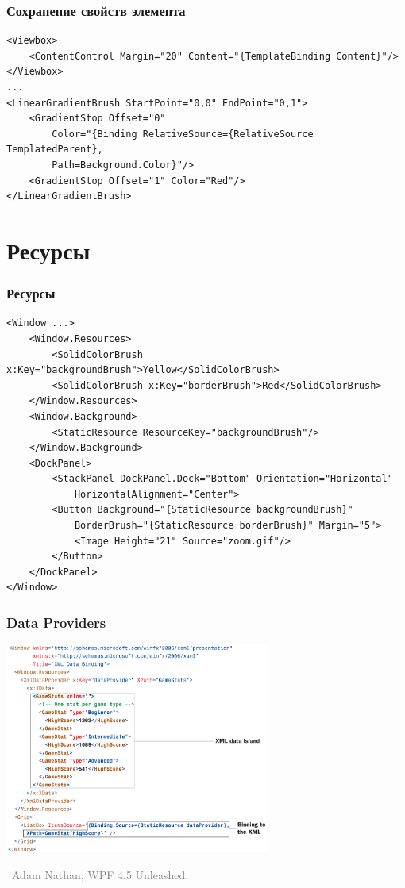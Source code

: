 \documentclass[xetex,mathserif,serif]{beamer}
\newcommand{\attribution}[1] {
\vspace{-5mm}\begin{flushright}\begin{scriptsize}\textcolor{gray}{\textcopyright\, #1}\end{scriptsize}\end{flushright}
}
\begin{document}
	\begin{frame}[fragile]
		\frametitle{Сохранение свойств элемента}
		\begin{scriptsize}
			\begin{verbatim}
<Viewbox>
    <ContentControl Margin="20" Content="{TemplateBinding Content}"/>
</Viewbox>
...
<LinearGradientBrush StartPoint="0,0" EndPoint="0,1">
    <GradientStop Offset="0"
        Color="{Binding RelativeSource={RelativeSource TemplatedParent},
        Path=Background.Color}"/>
    <GradientStop Offset="1" Color="Red"/>
</LinearGradientBrush>
			\end{verbatim}
		\end{scriptsize}
	\end{frame}

	\section{Ресурсы}

	\begin{frame}[fragile]
		\frametitle{Ресурсы}
		\begin{scriptsize}
			\begin{verbatim}
<Window ...>
    <Window.Resources>
        <SolidColorBrush x:Key="backgroundBrush">Yellow</SolidColorBrush>
        <SolidColorBrush x:Key="borderBrush">Red</SolidColorBrush>
    </Window.Resources>
    <Window.Background>
        <StaticResource ResourceKey="backgroundBrush"/>
    </Window.Background>
    <DockPanel>
        <StackPanel DockPanel.Dock="Bottom" Orientation="Horizontal"
            HorizontalAlignment="Center">
        <Button Background="{StaticResource backgroundBrush}"
            BorderBrush="{StaticResource borderBrush}" Margin="5">
            <Image Height="21" Source="zoom.gif"/>
        </Button>
    </DockPanel>
</Window>
			\end{verbatim}
		\end{scriptsize}
	\end{frame}

	\begin{frame}
		\frametitle{Data Providers}
		\begin{center}
			\includegraphics[width=0.65\textwidth]{xmlDataProvider.png}
		\end{center}
		\attribution{Adam Nathan, WPF 4.5 Unleashed.}
	\end{frame}
\end{document}
